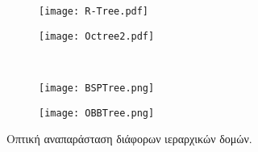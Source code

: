 \begin{figure}[H]
    \begin{subfigure}{0.5\textwidth}
        \centering
        \texttt{[image: R-Tree.pdf]}
        \caption{}
    \end{subfigure}
    \begin{subfigure}{0.5\textwidth}
        \centering
        \texttt{[image: Octree2.pdf]}
        \caption{}
    \end{subfigure}
    \\
    
    \centering
    \begin{subfigure}{0.8\textwidth}
        \centering
        \texttt{[image: BSPTree.png]}
        \caption{}
    \end{subfigure}
    \begin{subfigure}{0.8\textwidth}
        \centering
        \texttt{[image: OBBTree.png]}
        \caption{}
    \end{subfigure}
    \caption[Οπτική αναπαράσταση διάφορων ιεραρχικών δομών]{
        Οπτική αναπαράσταση διάφορων ιεραρχικών δομών.
    }

\end{figure}